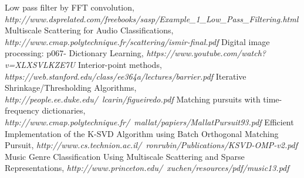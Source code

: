 \documentclass[final]{siamltexmm}
\begin{document}
\begin{thebibliography}{10}
 {\sc Low pass filter by FFT convolution}, {\em http://www.dsprelated.com/freebooks/sasp/Example\_1\_Low\_Pass\_Filtering.html}
 {\sc Multiscale Scattering for Audio Classifications}, {\em http://www.cmap.polytechnique.fr/scattering/ismir-final.pdf}
 {\sc Digital image processing: p067- Dictionary Learning}, {\em https://www.youtube.com/watch?v=XLXSVLKZE7U}
 {\sc Interior-point methods}, {\em https://web.stanford.edu/class/ee364a/lectures/barrier.pdf}
 {\sc Iterative Shrinkage/Thresholding Algorithms}, {\em http://people.ee.duke.edu/~lcarin/figueiredo.pdf}
 {\sc Matching pursuits with time-frequency dictionaries}, {\em http://www.cmap.polytechnique.fr/~mallat/papiers/MallatPursuit93.pdf}
 {\sc Efficient Implementation of the K-SVD Algorithm using Batch Orthogonal Matching Pursuit}, {\em http://www.cs.technion.ac.il/~ronrubin/Publications/KSVD-OMP-v2.pdf}
 {\sc Music Genre Classification Using Multiscale Scattering and Sparse Representations}, {\em http://www.princeton.edu/~xuchen/resources/pdf/music13.pdf}
\end{thebibliography}
\end{document}
